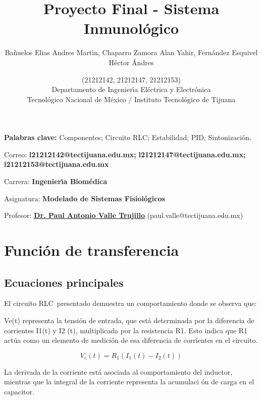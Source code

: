 \documentclass[letterpaper,11pt]{article}
\begin{document}
\title{Proyecto Final - Sistema Inmunol\'{o}gico}
\author{Ba\~{n}uelos Elias Andres Mart\'{\i}n, Chaparro Zamora Alan Yahir,
Fern\'{a}ndez Esquivel H\'{e}ctor \'{A}ndres \and (21212142, 21212147,
21212153) \\
Departamento de Ingenier\'{\i}a El\'{e}ctrica y Electr\'{o}nica\\
Tecnol\'{o}gico Nacional de M\'{e}xico / Instituto Tecnol\'{o}gico de Tijuana%
}
\maketitle

\noindent \textbf{Palabras clave: }Componentes; Circuito RLC; Estabilidad;
PID; Sintonizaci\'{o}n.

\noindent Correo: \textbf{l21212142@tectijuana.edu.mx;} \textbf{%
l21212147@tectijuana.edu.mx;} \textbf{l21212153@tectijuana.edu.mx}

\noindent \noindent Carrera: \textbf{Ingenier\'{\i}a Biom\'{e}dica}

\noindent Asignatura: \textbf{Modelado de Sistemas Fisiol\'{o}gicos}

\noindent Profesor: \href{https://biomath.xyz/}{\textbf{Dr. Paul Antonio
Valle Trujillo}} (paul.valle@tectijuana.edu.mx)

\section{Funci\'{o}n de transferencia}

\subsection{Ecuaciones principales}

El circuito RLC\ presentado demuestra un comportamiento donde se observa que:

Ve(t) representa la tensi\'{o}n de entrada, que est\'{a} determinada por la
diferencia de corrientes I1(t) y I2 (t), multiplicada por la resistencia R1.
Esto indica que R1 act\'{u}a como un elemento de medici\'{o}n de esa
diferencia de corrientes en el circuito.

\begin{equation*}
V_{e}(t)=R_{1}(I_{1}(t)-I_{2}(t))
\end{equation*}

La derivada de la corriente est\'{a} asociada al comportamiento del
inductor, mientras que la integral de la corriente representa la acumulaci%
\'{o}n de carga en el capacitor.
\end{document}
